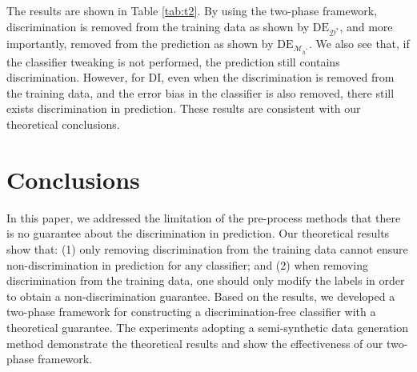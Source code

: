 \documentclass{article}
\begin{document}
The results are shown in Table \ref{tab:t2}. By using the two-phase framework, discrimination is removed from the training data as shown by $\mathrm{DE}_{\mathcal{D}^{*}}$, and more importantly, removed from the prediction as shown by $\mathrm{DE}_{\mathcal{M}_{h^{*}}}$. We also see that, if the classifier tweaking is not performed, the prediction still contains discrimination. However, for DI, even when the discrimination is removed from the training data, and the error bias in the classifier is also removed, there still exists discrimination in prediction. 
These results are consistent with our theoretical conclusions.

\section{Conclusions}
In this paper, we addressed the limitation of the pre-process methods that there is no guarantee about the discrimination in prediction. Our theoretical results show that: (1) only removing discrimination from the training data cannot ensure non-discrimination in prediction for any classifier; and (2) when removing discrimination from the training data, one should only modify the labels in order to obtain a non-discrimination guarantee. Based on the results, we developed a two-phase framework for constructing a discrimination-free classifier with a theoretical guarantee. The experiments adopting a semi-synthetic data generation method demonstrate the theoretical results and show the effectiveness of our two-phase framework.


\end{document}
